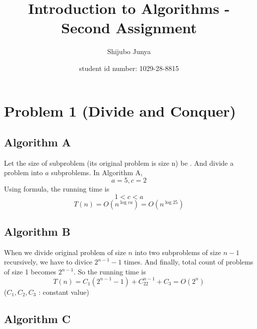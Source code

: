 \documentclass{jsarticle}
\begin{document}
\title{Introduction to Algorithms - Second Assignment}
\author{Shijubo Junya \and student id number: 1029-28-8815}
\maketitle

\section{Problem 1 (Divide and Conquer)}
\subsection{Algorithm A}

Let the size of subproblem (its original problem is size n) be . And divide a problem into $a$ subproblems.
In Algorithm A,
\[
a = 5,  c = 2
\]
Using formula, the running time is
\[
1 < c < a
\]
\[
T\left(n\right) = O\left(n^{\log{c}a}\right)
= O\left(n^{\log{2}5}\right)
\]

\subsection{Algorithm B}

When we divide original problem of size $n$ into two subproblems of size $n - 1$ recursively, we have to divice $2^{n-1}-1$ times. And finally, total count of problems of size 1 becomes $2^{n-1}$.
So the running time is
\[
T\left(n\right) = C_1\left(2^{n-1}-1\right) + C_22^{n-1} + C_3
= O\left(2^n\right)
\]
($C_1, C_2, C_3$ : constant value)

\subsection{Algorithm C}
\end{document}
